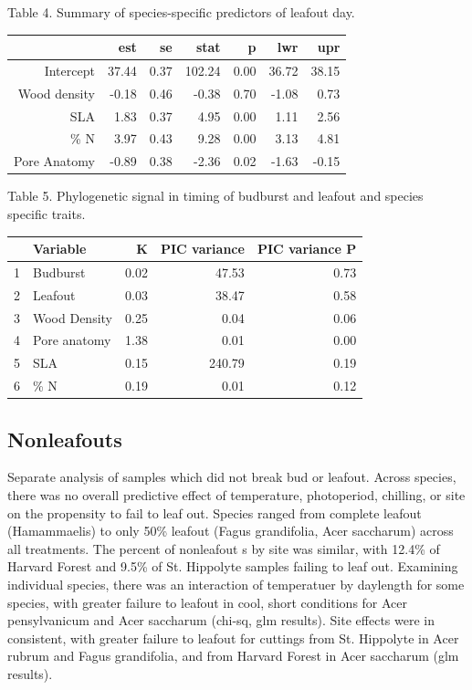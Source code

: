 \documentclass[11pt]{article}
\begin{document}
Table 4. Summary of species-specific predictors of leafout day. 
\begin{table}[ht]
\centering
\begin{tabular}{rrrrrrr}
  \hline
 & est & se & stat & p & lwr & upr \\ 
  \hline
 Intercept & 37.44 & 0.37 & 102.24 & 0.00 & 36.72 & 38.15 \\ 
  Wood density & -0.18 & 0.46 & -0.38 & 0.70 & -1.08 & 0.73 \\ 
  SLA & 1.83 & 0.37 & 4.95 & 0.00 & 1.11 & 2.56 \\ 
  \% N & 3.97 & 0.43 & 9.28 & 0.00 & 3.13 & 4.81 \\ 
Pore Anatomy & -0.89 & 0.38 & -2.36 & 0.02 & -1.63 & -0.15 \\ 
   \hline
\end{tabular}
\end{table}


Table 5. Phylogenetic signal in timing of budburst and leafout and species specific traits. 

\begin{table}[ht]
\centering
\begin{tabular}{rlrrr}
  \hline
 & Variable & K & PIC variance & PIC variance P \\ 
  \hline
1 & Budburst & 0.02 & 47.53 & 0.73 \\ 
  2 & Leafout & 0.03 & 38.47 & 0.58 \\ 
  3 & Wood Density & 0.25 & 0.04 & 0.06 \\ 
  4 & Pore anatomy & 1.38 & 0.01 & 0.00 \\ 
  5 & SLA & 0.15 & 240.79 & 0.19 \\ 
  6 & \% N & 0.19 & 0.01 & 0.12 \\ 
   \hline
\end{tabular}
\end{table}


\subsection{Nonleafouts}

Separate analysis of samples which did not break bud or leafout. Across species, there was no overall predictive effect of temperature, photoperiod, chilling, or site on the propensity to fail to leaf out. 
Species ranged from complete leafout (Hamammaelis) to only 50\% leafout (Fagus grandifolia, Acer saccharum) across all treatments. The percent of nonleafout s by site was similar, with 12.4\% of Harvard Forest and 9.5\% of St. Hippolyte samples failing to leaf out. Examining individual species,  there was an interaction of temperatuer by daylength for some species, with greater failure to leafout in cool, short conditions for Acer pensylvanicum  and Acer saccharum (chi-sq, glm results). Site effects were in consistent, with greater failure to leafout for cuttings from St. Hippolyte in Acer rubrum and Fagus grandifolia, and from Harvard Forest in Acer saccharum (glm results).
 
\end{document}
